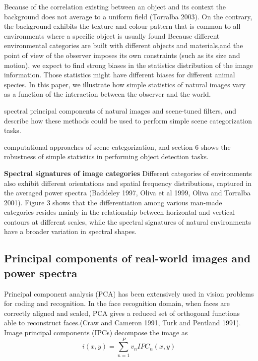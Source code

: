 \documentclass{article}
\begin{document}
Because of the correlation existing between an object and its context the background does not average to a uniform field (Torralba 2003). On the contrary, the background exhibits the texture and colour pattern that is common to all environments where a specific object is usually found  Because different environmental categories are built with different objects and materials,and the point of view of the observer imposes its own constraints (such as its size and motion), we expect to find strong biases in the statistics distribution of the image information. Those statistics might have different biases for different animal species. In this paper, we illustrate how simple statistics of natural images vary as a function of the
interaction between the observer and the world.

spectral principal components of natural images and scene-tuned
filters, and describe how these methods could be used to perform simple scene categorization
tasks. 

computational approaches of scene categorization, and section 6
shows the robustness of simple statistics in performing object detection tasks.

\textbf{Spectral signatures of image categories}
Different categories of environments also exhibit different orientations and spatial frequency distributions, captured in the averaged power spectra (Baddeley 1997, Oliva et al 1999, Oliva and Torralba 2001). Figure 3 shows that the differentiation among various man-made categories resides mainly in the relationship between horizontal and vertical contours at different scales, while the spectral signatures of natural environments have a broader variation in spectral shapes.

\subsection{Principal components of real-world images and power spectra}

Principal component analysis (PCA) has been extensively used in vision problems for coding and recognition. In the face recognition domain, when faces are correctly aligned and scaled, PCA gives a reduced set of orthogonal functions able to reconstruct faces.(Craw and Cameron 1991, Turk and Pentland 1991). Image principal components (IPCs) decompose the image as 
\begin{equation}
    i(x,y) = \sum^{P}_{n=1}v_{n}IPC_n(x,y)
\end{equation}
\end{document}
